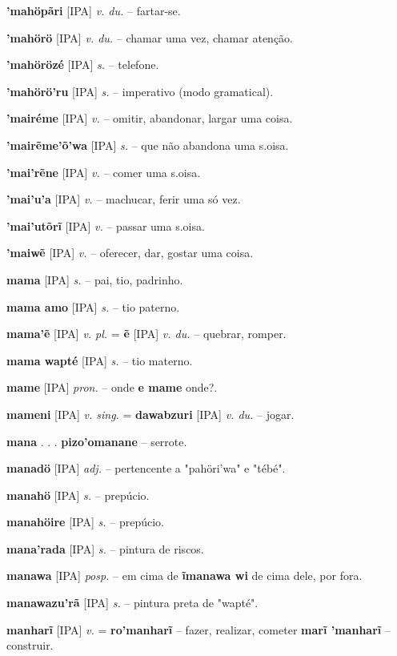\textbf{'mahöpãri} [IPA] \textit{v. du.} -- fartar-se.

\textbf{'mahörö} [IPA] \textit{v. du.} -- chamar uma vez, chamar atenção.

\textbf{'mahörözé} [IPA] \textit{s.} -- telefone.

\textbf{'mahörö'ru} [IPA] \textit{s.} -- imperativo (modo gramatical).

\textbf{'mairéme} [IPA] \textit{v.} -- omitir, abandonar, largar uma coisa.

\textbf{'mairẽme'õ'wa} [IPA] \textit{s.} -- que não abandona uma s.oisa.

\textbf{'mai'rẽne} [IPA] \textit{v.} -- comer uma s.oisa.

\textbf{'mai'u'a} [IPA] \textit{v.} -- machucar, ferir uma só vez.

\textbf{'mai'utõrĩ} [IPA] \textit{v.} -- passar uma s.oisa.

\textbf{'maiwẽ} [IPA] \textit{v.} -- oferecer, dar, gostar uma coisa.

\textbf{mama} [IPA] \textit{s.} -- pai, tio, padrinho.

\textbf{mama amo} [IPA] \textit{s.} -- tio paterno.

\textbf{mama'ẽ} [IPA] \textit{v. pl.} = \textbf{ẽ} [IPA] \textit{v. du.} -- quebrar, romper.

\textbf{mama wapté} [IPA] \textit{s.} -- tio materno.

\textbf{mame} [IPA] \textit{pron.} -- onde  \textbf{e mame} onde?.

\textbf{mameni} [IPA] \textit{v. sing.} = \textbf{dawabzuri} [IPA] \textit{v. du.} -- jogar.

\textbf{mana} . . .  \textbf{pizo'omanane} -- serrote.

\textbf{manadö} [IPA] \textit{adj.} -- pertencente a "pahöri'wa" e "tébé".

\textbf{manahö} [IPA] \textit{s.} -- prepúcio.

\textbf{manahöire} [IPA] \textit{s.} -- prepúcio.

\textbf{mana'rada} [IPA] \textit{s.} -- pintura de riscos.

\textbf{manawa} [IPA] \textit{posp.} -- em cima de  \textbf{ĩmanawa wi} de cima dele, por fora.

\textbf{manawazu'rã} [IPA] \textit{s.} -- pintura preta de "wapté".

\textbf{manharĩ} [IPA] \textit{v.} = \textbf{ro'manharĩ} -- fazer, realizar, cometer  \textbf{marĩ 'manharĩ} -- construir.

